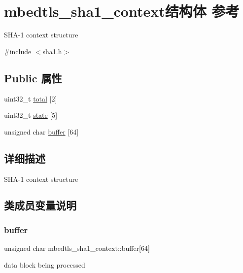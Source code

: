 \hypertarget{structmbedtls__sha1__context}{}\section{mbedtls\+\_\+sha1\+\_\+context结构体 参考}
\label{structmbedtls__sha1__context}


S\+H\+A-\/1 context structure  




{\ttfamily \#include $<$sha1.\+h$>$}

\subsection*{Public 属性}
\begin{DoxyCompactItemize}
\item 
uint32\+\_\+t \hyperlink{structmbedtls__sha1__context_a19789ddfacc37f47eb34e26ae718997e}{total} \mbox{[}2\mbox{]}
\item 
uint32\+\_\+t \hyperlink{structmbedtls__sha1__context_af651fef2b175fced6b05aa196fe1f0c8}{state} \mbox{[}5\mbox{]}
\item 
unsigned char \hyperlink{structmbedtls__sha1__context_ae3dcb1efeeb082beb006590a84ef22ec}{buffer} \mbox{[}64\mbox{]}
\end{DoxyCompactItemize}


\subsection{详细描述}
S\+H\+A-\/1 context structure 

\subsection{类成员变量说明}
\mbox{\label{structmbedtls__sha1__context_ae3dcb1efeeb082beb006590a84ef22ec}} 
\subsubsection{\texorpdfstring{buffer}{buffer}}
{\footnotesize\ttfamily unsigned char mbedtls\+\_\+sha1\+\_\+context\+::buffer\mbox{[}64\mbox{]}}

data block being processed \mbox{\label{structmbedtls__sha1__context_af651fef2b175fced6b05aa196fe1f0c8}} 
